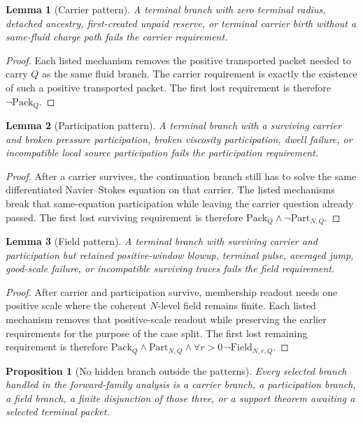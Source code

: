 \documentclass[11pt]{article}
\newtheorem{lemma}{Lemma}
\newtheorem{proposition}{Proposition}
\newcommand{\Pack}{\mathrm{Pack}}
\newcommand{\Part}{\mathrm{Part}}
\newcommand{\Field}{\mathrm{Field}}
\begin{document}
\begin{lemma}[Carrier pattern]
A terminal branch with zero terminal radius, detached ancestry, first-created unpaid reserve, or terminal carrier birth without a same-fluid charge path fails the carrier requirement.
\end{lemma}

\begin{proof}
Each listed mechanism removes the positive transported packet needed to carry \(Q\) as the same fluid branch.
The carrier requirement is exactly the existence of such a positive transported packet.
The first lost requirement is therefore \(\neg\Pack_Q\).
\end{proof}

\begin{lemma}[Participation pattern]
A terminal branch with a surviving carrier and broken pressure participation, broken viscosity participation, dwell failure, or incompatible local source participation fails the participation requirement.
\end{lemma}

\begin{proof}
After a carrier survives, the continuation branch still has to solve the same differentiated Navier--Stokes equation on that carrier.
The listed mechanisms break that same-equation participation while leaving the carrier question already passed.
The first lost surviving requirement is therefore \(\Pack_Q\wedge\neg\Part_{N,Q}\).
\end{proof}

\begin{lemma}[Field pattern]
A terminal branch with surviving carrier and participation but retained positive-window blowup, terminal pulse, averaged jump, good-scale failure, or incompatible surviving traces fails the field requirement.
\end{lemma}

\begin{proof}
After carrier and participation survive, membership readout needs one positive scale where the coherent \(N\)-level field remains finite.
Each listed mechanism removes that positive-scale readout while preserving the earlier requirements for the purpose of the case split.
The first lost remaining requirement is therefore \(\Pack_Q\wedge\Part_{N,Q}\wedge\forall r>0\,\neg\Field_{N,r,Q}\).
\end{proof}

\begin{proposition}[No hidden branch outside the patterns]
Every selected branch handled in the forward-family analysis is a carrier branch, a participation branch, a field branch, a finite disjunction of those three, or a support theorem awaiting a selected terminal packet.
\end{proposition}
\end{document}
